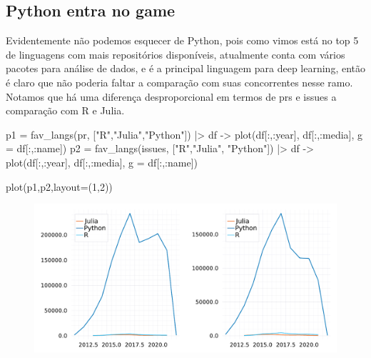 \documentclass[
  letterpaper,
  DIV=11,
  numbers=noendperiod]{scrartcl}
\newenvironment{Shaded}{\begin{snugshade}}{\end{snugshade}}
\newcommand{\FloatTok}[1]{\textcolor[rgb]{0.68,0.00,0.00}{#1}}
\newcommand{\FunctionTok}[1]{\textcolor[rgb]{0.28,0.35,0.67}{#1}}
\newcommand{\NormalTok}[1]{\textcolor[rgb]{0.00,0.23,0.31}{#1}}
\newcommand{\OperatorTok}[1]{\textcolor[rgb]{0.37,0.37,0.37}{#1}}
\newcommand{\StringTok}[1]{\textcolor[rgb]{0.13,0.47,0.30}{#1}}
\begin{document}
\subsection{Python entra no game}

Evidentemente não podemos esquecer de Python, pois como vimos está no
top 5 de linguagens com mais repositórios disponíveis, atualmente conta
com vários pacotes para análise de dados, e é a principal linguagem para
deep learning, então é claro que não poderia faltar a comparação com
suas concorrentes nesse ramo. Notamos que há uma diferença
desproporcional em termos de prs e issues a comparação com R e Julia.

\begin{Shaded}
\begin{Highlighting}[]
\NormalTok{p1 }\OperatorTok{=} \FunctionTok{fav\_langs}\NormalTok{(pr, [}\StringTok{"R"}\NormalTok{,}\StringTok{"Julia"}\NormalTok{,}\StringTok{"Python"}\NormalTok{]) }\OperatorTok{|\textgreater{}} 
\NormalTok{      df }\OperatorTok{{-}\textgreater{}} \FunctionTok{plot}\NormalTok{(df[}\OperatorTok{:}\NormalTok{,}\OperatorTok{:}\NormalTok{year], df[}\OperatorTok{:}\NormalTok{,}\OperatorTok{:}\NormalTok{media], g }\OperatorTok{=}\NormalTok{ df[}\OperatorTok{:}\NormalTok{,}\OperatorTok{:}\NormalTok{name])}
\NormalTok{p2 }\OperatorTok{=} \FunctionTok{fav\_langs}\NormalTok{(issues, [}\StringTok{"R"}\NormalTok{,}\StringTok{"Julia"}\NormalTok{, }\StringTok{"Python"}\NormalTok{]) }\OperatorTok{|\textgreater{}} 
\NormalTok{      df }\OperatorTok{{-}\textgreater{}} \FunctionTok{plot}\NormalTok{(df[}\OperatorTok{:}\NormalTok{,}\OperatorTok{:}\NormalTok{year], df[}\OperatorTok{:}\NormalTok{,}\OperatorTok{:}\NormalTok{media], g }\OperatorTok{=}\NormalTok{ df[}\OperatorTok{:}\NormalTok{,}\OperatorTok{:}\NormalTok{name])}

\FunctionTok{plot}\NormalTok{(p1,p2,layout}\OperatorTok{=}\NormalTok{(}\FloatTok{1}\NormalTok{,}\FloatTok{2}\NormalTok{))}
\end{Highlighting}
\end{Shaded}

\begin{figure}[H]

{\centering \includegraphics{report_files/figure-pdf/cell-11-output-1.pdf}

}

\end{figure}
\end{document}
